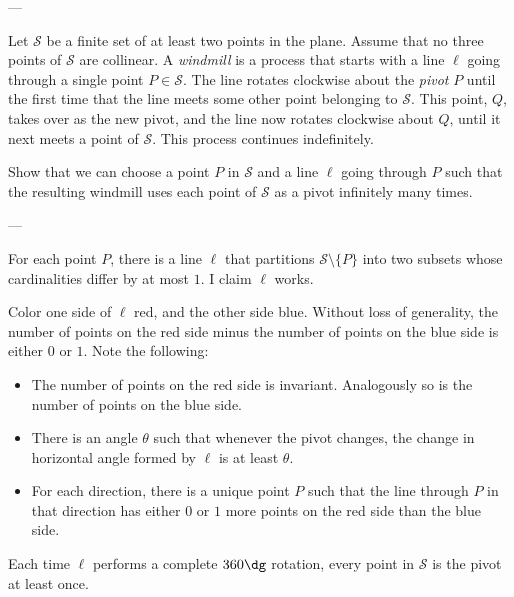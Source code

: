
---

Let $\mathcal S$ be a finite set of at least two points in the plane. Assume that no three points of $\mathcal S$ are collinear. A \emph{windmill} is a process that starts with a line $\ell$ going through a single point $P\in\mathcal S$. The line rotates clockwise about the \emph{pivot} $P$ until the first time that the line meets some other point belonging to $\mathcal S$. This point, $Q$, takes over as the new pivot, and the line now rotates clockwise about $Q$, until it next meets a point of $\mathcal S$. This process continues indefinitely.

Show that we can choose a point $P$ in $\mathcal S$ and a line $\ell$ going through $P$ such that the resulting windmill uses each point of $\mathcal S$ as a pivot infinitely many times.

---

For each point $P$, there is a line $\ell$ that partitions $\mathcal S\setminus\{P\}$ into two subsets whose cardinalities differ by at most $1$. I claim $\ell$ works.

Color one side of $\ell$ red, and the other side blue. Without loss of generality, the number of points on the red side minus the number of points on the blue side is either $0$ or $1$. Note the following:
\begin{itemize}
    \item The number of points on the red side is invariant. Analogously so is the number of points on the blue side.
    \item There is an angle $\theta$ such that whenever the pivot changes, the change in horizontal angle formed by $\ell$ is at least $\theta$.
    \item For each direction, there is a unique point $P$ such that the line through $P$ in that direction has either $0$ or $1$ more points on the red side than the blue side.
\end{itemize}
Each time $\ell$ performs a complete $360\dg$ rotation, every point in $\mathcal S$ is the pivot at least once.

